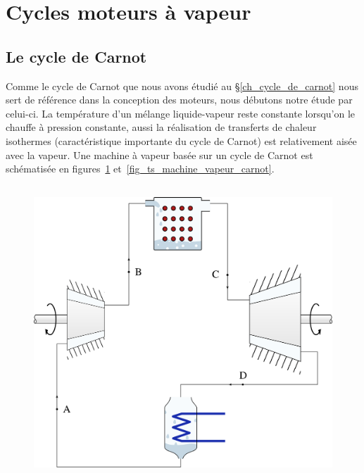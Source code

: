\section{Cycles moteurs à vapeur}
\label{ch_cycles_moteurs_vapeur}

	\subsection{Le cycle de Carnot}

		Comme le cycle de Carnot que nous avons étudié au \S\ref{ch_cycle_de_carnot} nous sert de référence dans la conception des moteurs, nous débutons notre étude par celui-ci. La température d’un mélange liquide-vapeur reste constante lorsqu’on le chauffe à pression constante, aussi la réalisation de transferts de chaleur isothermes (caractéristique importante du cycle de Carnot) est relativement aisée avec la vapeur. Une machine à vapeur basée sur un cycle de Carnot est schématisée en figures~\ref{fig_machine_vapeur_carnot} et~\ref{fig_ts_machine_vapeur_carnot}.

		\begin{figure}
			\begin{center}
				\includegraphics[height=11cm]{images/circuit_carnot_lv.png}
			\end{center}
			\label{fig_machine_vapeur_carnot}
		\end{figure}

